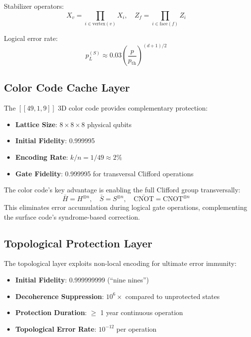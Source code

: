 \documentclass[12pt,a4paper]{article}
\theoremstyle{definition}
\begin{document}
Stabilizer operators:
\begin{equation}
X_v = \prod_{i \in \text{vertex}(v)} X_i, \quad Z_f = \prod_{i \in \text{face}(f)} Z_i
\end{equation}

Logical error rate:
\begin{equation}
p_L^{(S)} \approx 0.03 \left(\frac{p}{p_{\text{th}}}\right)^{(d+1)/2}
\end{equation}

\subsection{Color Code Cache Layer}
The $[[49,1,9]]$ 3D color code provides complementary protection:
\begin{itemize}
    \item \textbf{Lattice Size}: $8 \times 8 \times 8$ physical qubits
    \item \textbf{Initial Fidelity}: 0.999995
    \item \textbf{Encoding Rate}: $k/n = 1/49 \approx 2\%$
    \item \textbf{Gate Fidelity}: 0.999995 for transversal Clifford operations
\end{itemize}

The color code's key advantage is enabling the full Clifford group transversally:
\begin{equation}
\bar{H} = H^{\otimes n}, \quad \bar{S} = S^{\otimes n}, \quad \bar{\text{CNOT}} = \text{CNOT}^{\otimes n}
\end{equation}
This eliminates error accumulation during logical gate operations, complementing the surface code's syndrome-based correction.

\subsection{Topological Protection Layer}
The topological layer exploits non-local encoding for ultimate error immunity:
\begin{itemize}
    \item \textbf{Initial Fidelity}: 0.999999999 (``nine nines'')
    \item \textbf{Decoherence Suppression}: $10^6\times$ compared to unprotected states
    \item \textbf{Protection Duration}: $\geq$ 1 year continuous operation
    \item \textbf{Topological Error Rate}: $10^{-12}$ per operation
\end{itemize}
\end{document}
